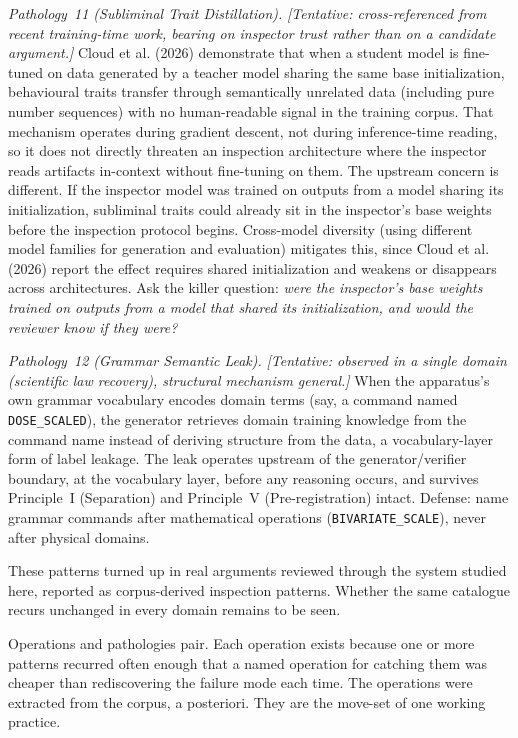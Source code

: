 \documentclass[
  11pt,
]{article}
\begin{document}
\emph{Pathology~11 (Subliminal Trait Distillation).}
\emph{{[}Tentative: cross-referenced from recent training-time work,
bearing on inspector trust rather than on a candidate argument.{]}} Cloud
et al. (2026) demonstrate that when a student model is fine-tuned on data
generated by a teacher model sharing the same base initialization,
behavioural traits transfer through semantically unrelated data
(including pure number sequences) with no human-readable signal in the
training corpus. That mechanism operates during gradient descent, not
during inference-time reading, so it does not directly threaten an
inspection architecture where the inspector reads artifacts in-context
without fine-tuning on them. The upstream concern is different. If the
inspector model was trained on outputs from a model sharing its
initialization, subliminal traits could already sit in the
inspector's base weights before the inspection protocol begins.
Cross-model diversity (using different model families for generation and
evaluation) mitigates this, since Cloud et al. (2026) report the effect
requires shared initialization and weakens or disappears across
architectures. Ask the killer question: \emph{were the inspector's base
weights trained on outputs from a model that shared its initialization,
and would the reviewer know if they were?}

\emph{Pathology~12 (Grammar Semantic Leak).} \emph{{[}Tentative:
observed in a single domain (scientific law recovery), structural
mechanism general.{]}} When the apparatus's own grammar vocabulary
encodes domain terms (say, a command named \texttt{DOSE\_SCALED}), the
generator retrieves domain training knowledge from the command name
instead of deriving structure from the data, a vocabulary-layer form of label leakage. The leak operates upstream
of the generator/verifier boundary, at the vocabulary layer, before any
reasoning occurs, and survives Principle~I (Separation) and Principle~V
(Pre-registration) intact. Defense: name grammar commands after
mathematical operations (\texttt{BIVARIATE\_SCALE}), never after physical
domains.

These patterns turned up in real arguments reviewed through the system
studied here, reported as corpus-derived inspection patterns. Whether the
same catalogue recurs unchanged in every domain remains to be seen.

Operations and pathologies pair. Each operation exists
because one or more patterns recurred often enough that a
named operation for catching them was cheaper than rediscovering the
failure mode each time. The operations were extracted from the corpus, a
posteriori. They are the move-set of one working practice.
\end{document}
